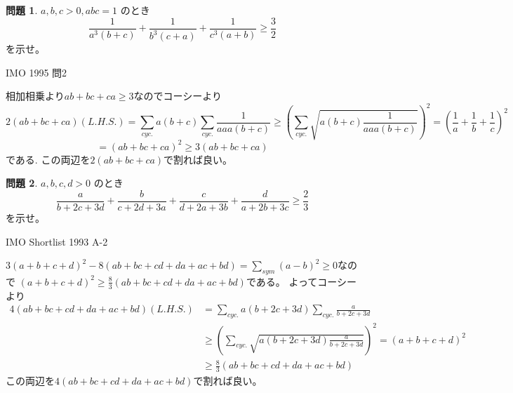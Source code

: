 \documentclass[uplatex, a5paper]{jsarticle}
\makeatletter
\theoremstyle{definition}
\newtheorem{prob}{問題}
\renewenvironment{proof}[1][\proofname]{
  \pushQED{\qed}%
  \normalfont \topsep6\p@\@plus6\p@\relax
  \trivlist
  \item[\hskip\labelsep
    #1\@addpunct{\textbf{.}}]\ignorespaces
}{%
  \popQED\endtrivlist\@endpefalse
}
\providecommand{\proofname}{証明}
\def\qed{\hfill $\Box$}
\makeatother
\begin{document}
\newpage

\begin{prob}
  \(a,b,c>0,abc=1\)
  のとき
  \[
  \frac{1}{a^3(b+c)} + \frac{1}{b^3(c+a)} + \frac{1}{c^3(a+b)} \geq \frac{3}{2}
  \]
  を示せ。
  \begin{flushright}
    IMO 1995 問2
  \end{flushright}
\end{prob}


\begin{proof}
  相加相乗より\(ab+bc+ca \geq 3\)なのでコーシーより
  \[
  2(ab+bc+ca)(L.H.S.)
  = \sum_{cyc.}a(b+c)\sum_{cyc.}\frac{1}{aaa(b+c)}
  \geq \left( \sum_{cyc.}\sqrt{a(b+c)\frac{1}{aaa(b+c)}} \right)^2
  = \left( \frac{1}{a} + \frac{1}{b} + \frac{1}{c} \right)^2
  \]
  \[
  = (ab+bc+ca)^2 \geq 3(ab+bc+ca)
  \]
  である.
  この両辺を\(2(ab+bc+ca)\)で割れば良い。
\end{proof}











\newpage

\begin{prob}
  \(a,b,c,d>0\)
  のとき
  \[
  \frac{a}{b+2c+3d} + \frac{b}{c+2d+3a} + \frac{c}{d+2a+3b} + \frac{d}{a+2b+3c} \geq \frac{2}{3}
  \]
  を示せ。
  \begin{flushright}
    IMO Shortlist 1993 A-2
  \end{flushright}
\end{prob}


\begin{proof}
  \(3(a+b+c+d)^2 - 8(ab+bc+cd+da+ac+bd) = \sum_{sym}(a-b)^2 \geq 0\)なので
  \((a+b+c+d)^2 \geq \displaystyle\frac{8}{3}(ab+bc+cd+da+ac+bd)\)である。
  よってコーシーより
  \begin{align*}
    4(ab+bc+cd+da+ac+bd)(L.H.S.) &=  \sum_{cyc.}a(b+2c+3d)\sum_{cyc.}\frac{a}{b+2c+3d}  \\
    &\geq \left( \sum_{cyc.}\sqrt{a(b+2c+3d)\frac{a}{b+2c+3d}} \right) ^2 =(a+b+c+d)^2  \\
    &\geq \frac{8}{3}(ab+bc+cd+da+ac+bd)
  \end{align*}
  この両辺を\(4(ab+bc+cd+da+ac+bd)\)で割れば良い。
\end{proof}
\end{document}
